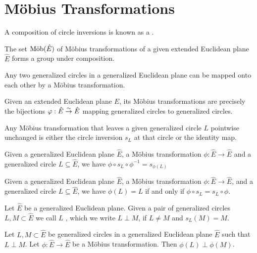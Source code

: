 \section{Möbius Transformations}
\begin{definition}
	A composition of circle inversions is known as a .
\end{definition}
\begin{exercise}
	The set $\textnormal{Möb}(\hat E)$ of Möbius transformations of a given extended Euclidean plane $\hat E$ forms a group under composition.
\end{exercise}
\begin{exercise}
	Any two generalized circles in a generalized Euclidean plane can be mapped onto each other by a Möbius transformation.
\end{exercise}
\begin{theorem}
	Given an extended Euclidean plane $E$, its Möbius transformations are precisely the bijections $\varphi : \hat E \overset{\sim}{\rightarrow} \hat E$ mapping generalized circles to generalized circles.
\end{theorem}
\begin{theorem}
	Any Möbius transformation that leaves a given generalized circle $L$ pointwise unchanged is either the circle inversion $s_L$ at that circle or the identity map.
\end{theorem}
\begin{exercise}
	Given a generalized Euclidean plane $\hat E$, a Möbius transformation $\phi : \hat E \to \hat E$ and a generalized circle $L \subseteq \hat E$, we have $\phi \circ s_L \circ \phi^{-1} = s_{\phi(L)}$
\end{exercise}
\begin{exercise}
	Given a generalized Euclidean plane $\hat E$, a Möbius transformation $\phi : \hat E \to \hat E$, and a generalized circle $L \subseteq \hat E$, we have $\phi(L) = L$ if and only if $\phi \circ s_L = s_L \circ \phi$.
\end{exercise}
\begin{definition}
	Let $\hat E$ be a generalized Euclidean plane. Given a pair of generalized circles $L, M \subset \hat E$ we call $L$ , which we write $L \perp M$, if $L \neq M$ and $s_L(M) = M$.
\end{definition}
\begin{theorem}
	Let $L,M \subset \hat E$ be generalized circles in a generalized Euclidean plane $\hat E$ such that $L \perp M$. Let $\phi : \hat E \to \hat E$ be a Möbius transformation. Then $\phi(L) \perp \phi(M)$.
\end{theorem}
